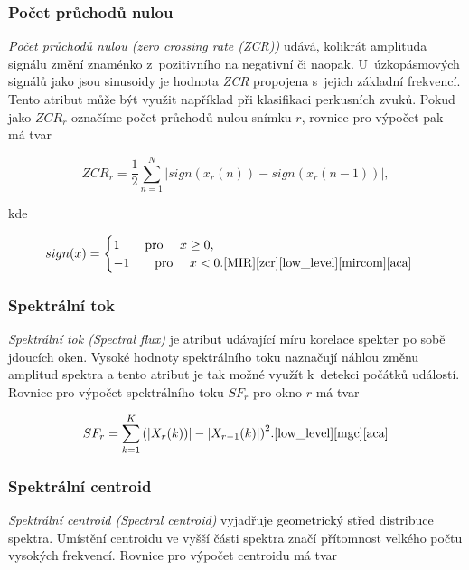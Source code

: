 \subsubsection*{Počet průchodů nulou}
\textit{Počet průchodů nulou (zero crossing rate (ZCR))} udává, kolikrát amplituda signálu změní znaménko z~pozitivního na negativní či naopak. U~úzkopásmových signálů jako jsou sinusoidy je hodnota \textit{ZCR} propojena s~jejich základní frekvencí. Tento atribut může být využit například při klasifikaci perkusních zvuků. Pokud jako $ZCR_r$ označíme počet průchodů nulou snímku $r$, rovnice pro výpočet pak má tvar

\begin{equation}
	ZCR_r = \frac{1}{2} \sum\limits_{n=1}^{N} | sign(x_r(n)) - sign(x_r(n-1)) |,
\end{equation}

\medskip

\noindent kde

\begin{equation}
    sign(x)=
    \begin{cases}
        1 \text{\qquad pro \quad} x \geq 0,\\
        -1 \text{\qquad pro \quad} x < 0. \text{\cite{MIR}\cite{zcr}\cite{low_level}\cite{mircom}\cite{aca}}
    \end{cases}
\end{equation}

\subsubsection*{Spektrální tok}
\textit{Spektrální tok (Spectral flux)} je atribut udávající míru korelace spekter po sobě jdoucích oken. Vysoké hodnoty spektrálního toku naznačují náhlou změnu amplitud spektra a tento atribut je tak možné využít k~detekci počátků událostí. Rovnice pro výpočet spektrálního toku $SF_r$ pro okno $r$ má tvar

\begin{equation}
	SF_r = \sum\limits_{k=1}^{K} {(|X_r(k))| - |X_{r-1}(k)|)}^2.\text{\cite{low_level}\cite{mgc}\cite{aca}}
\end{equation}

\subsubsection*{Spektrální centroid}
\textit{Spektrální centroid (Spectral centroid)} vyjadřuje geometrický střed distribuce spektra. Umístění centroidu ve vyšší části spektra značí přítomnost velkého počtu vysokých frekvencí. Rovnice pro výpočet centroidu má tvar

